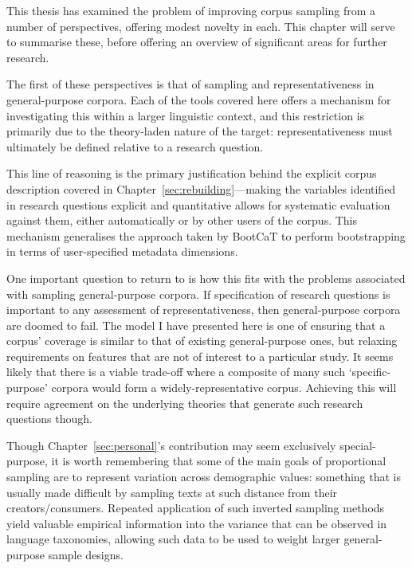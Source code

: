 

This thesis has examined the problem of improving corpus sampling from a number of perspectives, offering modest novelty in each.  This chapter will serve to summarise these, before offering an overview of significant areas for further research.

The first of these perspectives is that of sampling and representativeness in general-purpose corpora.  Each of the tools covered here offers a mechanism for investigating this within a larger linguistic context, and this restriction is primarily due to the theory-laden nature of the target: representativeness must ultimately be defined relative to a research question.

This line of reasoning is the primary justification behind the explicit corpus description covered in Chapter~\ref{sec:rebuilding}---making the variables identified in research questions explicit and quantitative allows for systematic evaluation against them, either automatically or by other users of the corpus.  This mechanism generalises the approach taken by BootCaT to perform bootstrapping in terms of user-specified metadata dimensions.

One important question to return to is how this fits with the problems associated with sampling general-purpose corpora.  If specification of research questions is important to any assessment of representativeness, then general-purpose corpora are doomed to fail.  The model I have presented here is one of ensuring that a corpus' coverage is similar to that of existing general-purpose ones, but relaxing requirements on features that are not of interest to a particular study.  It seems likely that there is a viable trade-off where a composite of many such `specific-purpose' corpora would form a widely-representative corpus.  Achieving this will require agreement on the underlying theories that generate such research questions though.

Though Chapter~\ref{sec:personal}'s contribution may seem exclusively special-purpose, it is worth remembering that some of the main goals of proportional sampling are to represent variation across demographic values: something that is usually made difficult by sampling texts at such distance from their creators/consumers.  Repeated application of such inverted sampling methods yield valuable empirical information into the variance that can be observed in language taxonomies, allowing such data to be used to weight larger general-purpose sample designs.


